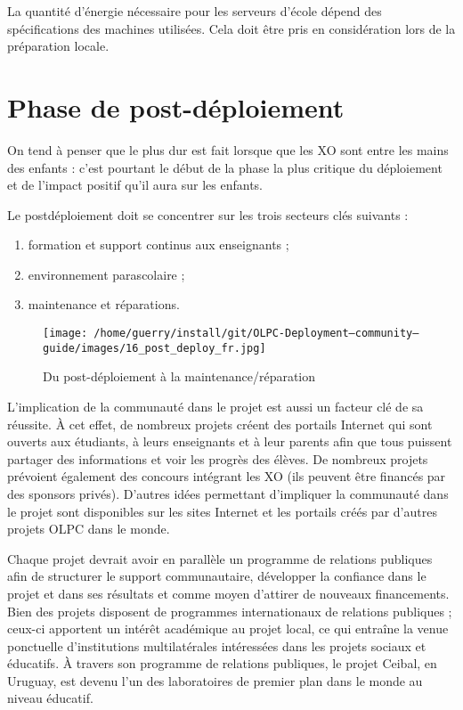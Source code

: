 \documentclass[12pt]{article}
\begin{document}
La quantité d'énergie nécessaire pour les serveurs d'école dépend des
spécifications des machines utilisées.  Cela doit être pris en
considération lors de la préparation locale.

\pagebreak
\section{Phase de post-déploiement}
\label{sec-10}


On tend à penser que le plus dur est fait lorsque que les XO sont entre les
mains des enfants : c'est pourtant le début de la phase la plus critique du
déploiement et de l'impact positif qu'il aura sur les enfants.

Le postdéploiement doit se concentrer sur les trois secteurs clés suivants :


\begin{enumerate}
\item formation et support continus aux enseignants ;
\item environnement parascolaire ;
\item maintenance et réparations.
\end{enumerate}

\begin{figure}[htb]
\centering
\texttt{[image: /home/guerry/install/git/OLPC-Deployment--community--guide/images/16\_post\_deploy\_fr.jpg]}
\caption{Du post-déploiement à la maintenance/réparation}
\end{figure}

L'implication de la communauté dans le projet est aussi un facteur clé de
sa réussite. À cet effet, de nombreux projets créent des portails Internet
qui sont ouverts aux étudiants, à leurs enseignants et à leur parents afin
que tous puissent partager des informations et voir les progrès des
élèves. De nombreux projets prévoient également des concours intégrant les
XO (ils peuvent être financés par des sponsors privés). D'autres idées
permettant d'impliquer la communauté dans le projet sont disponibles sur
les sites Internet et les portails créés par d'autres projets OLPC dans le
monde.

Chaque projet devrait avoir en parallèle un programme de relations
publiques afin de structurer le support communautaire, développer la
confiance dans le projet et dans ses résultats et comme moyen d'attirer de
nouveaux financements. Bien des projets disposent de programmes
internationaux de relations publiques ; ceux-ci apportent un intérêt
académique au projet local, ce qui entraîne la venue ponctuelle
d'institutions multilatérales intéressées dans les projets sociaux et
éducatifs. À travers son programme de relations publiques, le projet
Ceibal, en Uruguay, est devenu l'un des laboratoires de premier plan dans
le monde au niveau éducatif.
\end{document}
